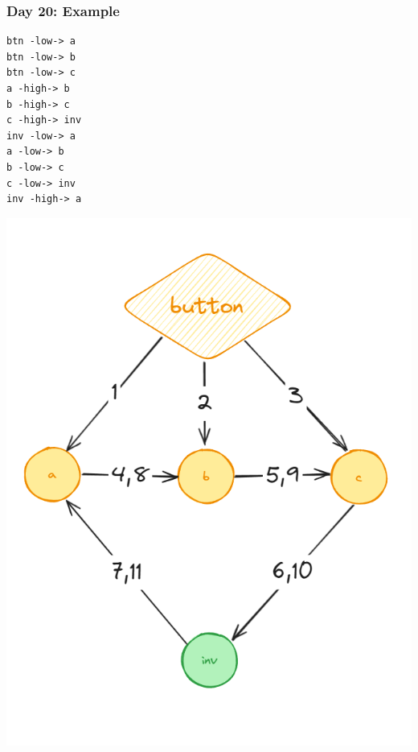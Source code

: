 \begin{frame}[fragile]
\frametitle{Day 20: Example}

    \begin{center}
        \begin{minipage}{0.45\textwidth}
            \begin{center}
                \begin{verbatim}
btn -low-> a
btn -low-> b
btn -low-> c
a -high-> b
b -high-> c
c -high-> inv
inv -low-> a
a -low-> b
b -low-> c
c -low-> inv
inv -high-> a      
                \end{verbatim}
            \end{center}
        \end{minipage}
        \begin{minipage}{0.45\textwidth}
            \begin{center}
                \includegraphics[width=\textwidth]{Day20ExampleGraph}
            \end{center}
        \end{minipage}
    \end{center}

\end{frame}

